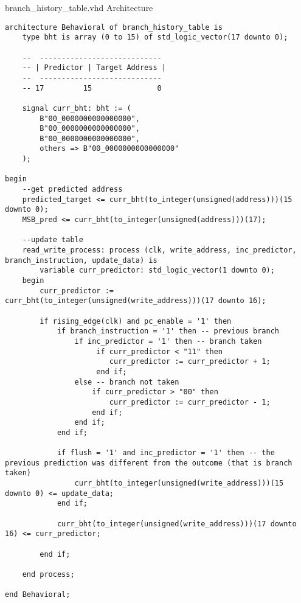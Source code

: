 \documentclass[a4paper,12pt]{report}
\begin{document}
\begin{my-listing}{ branch\_history\_table.vhd Architecture}
    \begin{lstlisting}[style=vhdl]
architecture Behavioral of branch_history_table is
    type bht is array (0 to 15) of std_logic_vector(17 downto 0);
    
    --  ----------------------------
    -- | Predictor | Target Address |
    --  ----------------------------
    -- 17         15               0 
    
    signal curr_bht: bht := (
        B"00_0000000000000000",
        B"00_0000000000000000",
        B"00_0000000000000000",
        others => B"00_0000000000000000"
    );
    
begin
    --get predicted address
    predicted_target <= curr_bht(to_integer(unsigned(address)))(15 downto 0);
    MSB_pred <= curr_bht(to_integer(unsigned(address)))(17);
    
    --update table
    read_write_process: process (clk, write_address, inc_predictor, branch_instruction, update_data) is 
        variable curr_predictor: std_logic_vector(1 downto 0);
    begin
        curr_predictor := curr_bht(to_integer(unsigned(write_address)))(17 downto 16);
        
        if rising_edge(clk) and pc_enable = '1' then
            if branch_instruction = '1' then -- previous branch
                if inc_predictor = '1' then -- branch taken
                     if curr_predictor < "11" then
                        curr_predictor := curr_predictor + 1;
                     end if;
                else -- branch not taken
                    if curr_predictor > "00" then
                        curr_predictor := curr_predictor - 1;
                    end if;
                end if;
            end if;
            
            if flush = '1' and inc_predictor = '1' then -- the previous prediction was different from the outcome (that is branch taken)
                curr_bht(to_integer(unsigned(write_address)))(15 downto 0) <= update_data;
            end if; 
        
            curr_bht(to_integer(unsigned(write_address)))(17 downto 16) <= curr_predictor;
        
        end if;
       
    end process;

end Behavioral;
    \end{lstlisting}
\end{my-listing}
\end{document}
